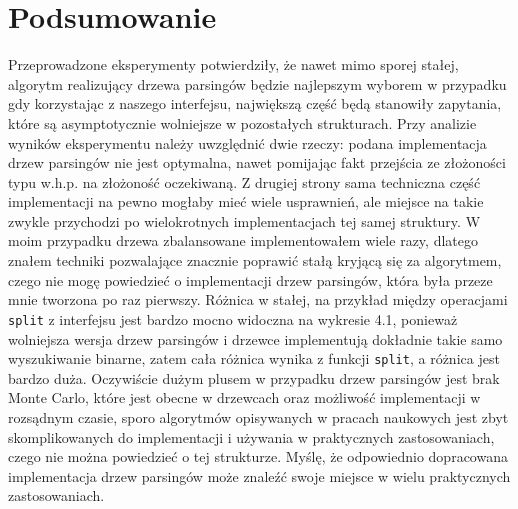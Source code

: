 \documentclass[declaration,shortabstract]{iithesis}
\theoremstyle{definition} \newtheorem{definition}{Definicja}[chapter]
\theoremstyle{plain} \newtheorem{remark}[definition]{Obserwacja}
\theoremstyle{plain} \newtheorem{theorem}[definition]{Twierdzenie}
\theoremstyle{plain} \newtheorem{example}{Przykład}[definition]
\theoremstyle{plain} \newtheorem{lemma}[definition]{Lemat}
\begin{document}
\begin{figure}[!htb]
    \centering
    \scalebox{0.8}{}
\end{figure}

\section{Podsumowanie}

Przeprowadzone eksperymenty potwierdziły, że nawet mimo sporej stałej, algorytm realizujący drzewa parsingów będzie najlepszym wyborem w przypadku gdy korzystając z naszego interfejsu, największą część będą stanowiły zapytania, które są asymptotycznie wolniejsze w pozostałych strukturach. Przy analizie wyników eksperymentu należy uwzględnić dwie rzeczy: podana implementacja drzew parsingów nie jest optymalna, nawet pomijając fakt przejścia ze złożoności typu w.h.p. na złożoność oczekiwaną. Z drugiej strony sama techniczna część implementacji na pewno mogłaby mieć wiele usprawnień, ale miejsce na takie zwykle przychodzi po wielokrotnych implementacjach tej samej struktury. W moim przypadku drzewa zbalansowane implementowałem wiele razy, dlatego znałem techniki pozwalające znacznie poprawić stałą kryjącą się za algorytmem, czego nie mogę powiedzieć o implementacji drzew parsingów, która była przeze mnie tworzona po raz pierwszy. Różnica w stałej, na przykład między operacjami \texttt{split} z interfejsu jest bardzo mocno widoczna na wykresie 4.1, ponieważ wolniejsza wersja drzew parsingów i drzewce implementują dokładnie takie samo wyszukiwanie binarne, zatem cała różnica wynika z funkcji \texttt{split}, a różnica jest bardzo duża. Oczywiście dużym plusem w przypadku drzew parsingów jest brak Monte Carlo, które jest obecne w drzewcach oraz możliwość implementacji w rozsądnym czasie, sporo algorytmów opisywanych w pracach naukowych jest zbyt skomplikowanych do implementacji i używania w praktycznych zastosowaniach, czego nie można powiedzieć o tej strukturze. Myślę, że odpowiednio dopracowana implementacja drzew parsingów może znaleźć swoje miejsce w wielu praktycznych zastosowaniach.



\end{document}
